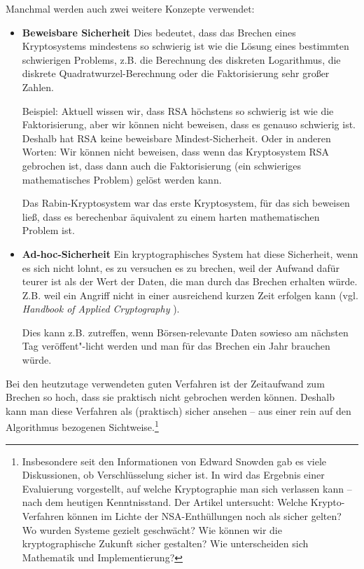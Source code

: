 \begin{refsegment}
\begin{itemize}
\end{itemize}


Manchmal werden auch zwei weitere Konzepte verwendet:

\begin{itemize}

\item \textbf{Beweisbare Sicherheit}
Dies bedeutet, dass das Brechen eines Kryptosystems mindestens so schwierig ist
wie die Lösung eines bestimmten schwierigen Problems, z.B. die Berechnung des
diskreten Logarithmus, die diskrete Quadratwurzel-Berechnung oder die
Faktorisierung sehr großer Zahlen.

Beispiel: Aktuell wissen wir, dass RSA höchstens so schwierig
ist wie die Faktorisierung, aber wir können nicht beweisen, dass es genauso
schwierig ist.
Deshalb hat RSA keine beweisbare Mindest-Sicherheit. Oder in anderen Worten:
Wir können nicht beweisen, dass wenn das Kryptosystem RSA gebrochen ist, dass
dann auch die Faktorisierung (ein schwieriges mathematisches Problem) gelöst
werden kann.

Das Rabin-Kryptosystem war das erste Kryptosystem, für das sich beweisen ließ,
dass es berechenbar äquivalent zu einem harten mathematischen Problem ist.

\item \textbf{Ad-hoc-Sicherheit}
Ein kryptographisches System hat diese Sicherheit, wenn es sich nicht lohnt,
es zu versuchen es zu brechen, weil der Aufwand dafür teurer ist als der Wert
der Daten, die man durch das Brechen erhalten würde. Z.B. weil ein Angriff
nicht in einer ausreichend kurzen Zeit erfolgen kann (vgl.
{\em Handbook of Applied Cryptography} \cite{Menezes2001}).

Dies kann z.B. zutreffen, wenn Börsen-relevante Daten sowieso am
nächsten Tag veröffent"-licht werden und man für das Brechen ein Jahr brauchen
würde.

\end{itemize}


Bei den heutzutage verwendeten guten Verfahren ist der Zeitaufwand zum Brechen
so hoch, dass sie praktisch nicht gebrochen werden können. Deshalb kann man
diese Verfahren als (praktisch) sicher ansehen -- aus einer rein auf den
Algorithmus bezogenen Sichtweise.\footnote{%
  Insbesondere seit den Informationen von Edward Snowden gab es
  viele Diskussionen, ob Verschlüsselung sicher ist. In \cite{Esslinger2014} wird das
  Ergebnis einer Evaluierung vorgestellt, auf welche Kryptographie man sich verlassen
  kann -- nach dem heutigen Kenntnisstand.
  Der Artikel untersucht: Welche Krypto-Verfahren können im Lichte der NSA-Enthüllungen
  noch als sicher gelten? Wo wurden Systeme gezielt geschwächt? Wie können wir die
  kryptographische Zukunft sicher gestalten? Wie unterscheiden sich Mathematik und
  Implementierung?
}


\end{refsegment}
